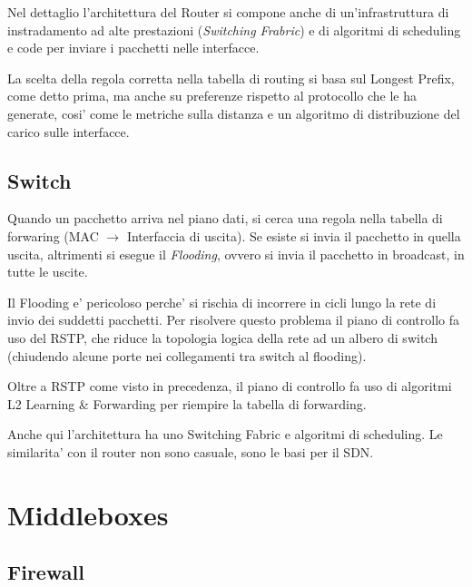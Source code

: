 Nel dettaglio l'architettura del Router si compone anche di un'infrastruttura di instradamento ad alte prestazioni (\textit{Switching Frabric}) e di algoritmi di scheduling e code per inviare i pacchetti nelle interfacce.


La scelta della regola corretta nella tabella di routing si basa sul Longest Prefix, come detto prima, ma anche su preferenze rispetto al protocollo che le ha generate, cosi' come le metriche sulla distanza e un algoritmo di distribuzione del carico sulle interfacce.


\subsection{Switch}

Quando un pacchetto arriva nel piano dati, si cerca una regola nella tabella di forwaring (MAC $\rightarrow$ Interfaccia di uscita). Se esiste si invia il pacchetto in quella uscita, altrimenti si esegue il \textit{Flooding}, ovvero si invia il pacchetto in broadcast, in tutte le uscite.


Il Flooding e' pericoloso perche' si rischia di incorrere in cicli lungo la rete di invio dei suddetti pacchetti. Per risolvere questo problema il piano di controllo fa uso del RSTP, che riduce la topologia logica della rete ad un albero di switch (chiudendo alcune porte nei collegamenti tra switch al flooding).

Oltre a RSTP come visto in precedenza, il piano di controllo fa uso di algoritmi L2 Learning \& Forwarding per riempire la tabella di forwarding.


Anche qui l'architettura ha uno Switching Fabric e algoritmi di scheduling. Le similarita' con il router non sono casuale, sono le basi per il SDN.


\section{Middleboxes}

\subsection{Firewall}


